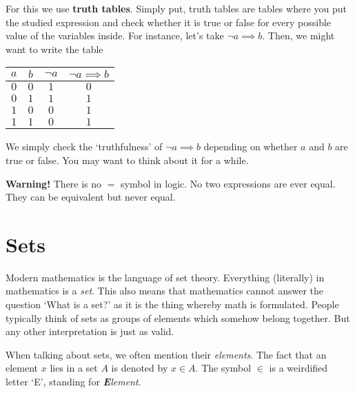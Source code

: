 \documentclass[a4paper,11pt]{article}
\begin{document}
 For this we use \textbf{truth tables}. Simply put, truth tables are tables
 where you put the studied expression and check whether it is true or false for
 every possible value of the variables inside. For instance, let's take $\neg
 a \implies b$. Then, we might want to write the table
 \begin{center}
  \begin{tabular}{c|c|c|c}
   $a$ & $b$ & $\neg a$ & $\neg a \implies b$ \\
   \hline
   $0$ & $0$ &  $1$ & $0$\\
   $0$ & $1$ & $1$ &  $1$\\
    $1$ &  $0$ &  $0$ &  $1$\\
     $1$ & $1$& $0$ & $1$
  \end{tabular}
 \end{center}
 We simply check the `truthfulness' of $\neg a \implies b$ depending on whether
 $a$ and $b$ are true or false. You may want to think about it for a while.

 \textbf{Warning!} There is no $=$ symbol in logic. No two expressions are ever
 equal. They can be equivalent but never equal.

 \section*{Sets}
 Modern mathematics is the language of set theory. Everything (literally) in
 mathematics is a \emph{set}. This also means that mathematics cannot answer
 the question `What is a set?' as it is the thing whereby math is formulated.
 People typically think of sets as groups of elements which somehow belong
 together. But any other interpretation is just as valid.

 When talking about sets, we often mention their \emph{elements}. The fact that
 an element $x$ lies in a set $A$ is denoted by $x \in A$. The symbol $\in$ is
 a weirdified letter `E', standing for \emph{\textbf{E}lement}.
\end{document}
